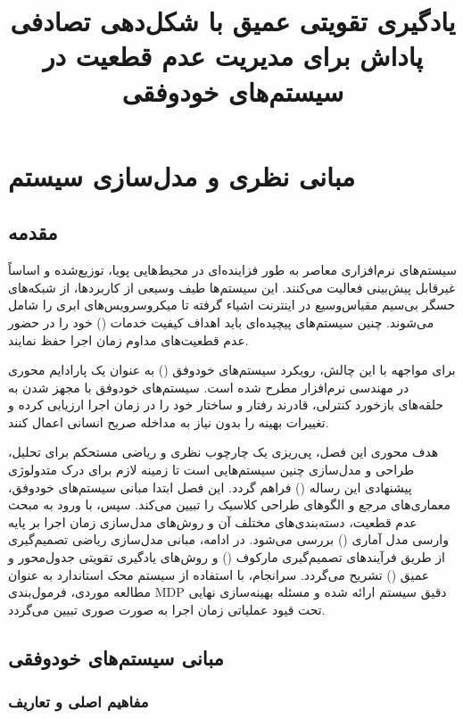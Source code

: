 \documentclass[oneside,openany,phd]{TMU-Thesis}
\title{یادگیری تقویتی عمیق با شکل‌دهی تصادفی پاداش برای مدیریت عدم قطعیت در سیستم‌های خودوفقی}
\begin{document}
\AutoPersianDigits
{}

\setcounter{chapter}{1}

\chapter{مبانی نظری و مدل‌سازی سیستم}
\label{ch:theory_and_modeling}

\section{مقدمه}

سیستم‌های نرم‌افزاری معاصر به طور فزاینده‌ای در محیط‌هایی پویا، توزیع‌شده و اساساً غیرقابل پیش‌بینی فعالیت می‌کنند. این سیستم‌ها طیف وسیعی از کاربردها، از شبکه‌های حسگر بی‌سیم مقیاس‌وسیع در اینترنت اشیاء گرفته تا میکروسرویس‌های ابری را شامل می‌شوند. چنین سیستم‌های پیچیده‌ای باید اهداف کیفیت خدمات () خود را در حضور عدم قطعیت‌های مداوم زمان اجرا حفظ نمایند.

برای مواجهه با این چالش، رویکرد سیستم‌های خودوفق () به عنوان یک پارادایم محوری در مهندسی نرم‌افزار مطرح شده است. سیستم‌های خودوفق با مجهز شدن به حلقه‌های بازخورد کنترلی، قادرند رفتار و ساختار خود را در زمان اجرا ارزیابی کرده و تغییرات بهینه را بدون نیاز به مداخله صریح انسانی اعمال کنند.

هدف محوری این فصل، پی‌ریزی یک چارچوب نظری و ریاضی مستحکم برای تحلیل، طراحی و مدل‌سازی چنین سیستم‌هایی است تا زمینه لازم برای درک متدولوژی پیشنهادی این رساله () فراهم گردد. این فصل ابتدا مبانی سیستم‌های خودوفق، معماری‌های مرجع و الگوهای طراحی کلاسیک را تبیین می‌کند. سپس، با ورود به مبحث عدم قطعیت، دسته‌بندی‌های مختلف آن و روش‌های مدل‌سازی زمان اجرا بر پایه وارسی مدل آماری () بررسی می‌شود. در ادامه، مبانی مدل‌سازی ریاضی تصمیم‌گیری از طریق فرآیندهای تصمیم‌گیری مارکوف () و روش‌های یادگیری تقویتی جدول‌محور و عمیق () تشریح می‌گردد. سرانجام، با استفاده از سیستم محک استاندارد  به عنوان مطالعه موردی، فرمول‌بندی MDP دقیق سیستم ارائه شده و مسئله بهینه‌سازی نهایی تحت قیود عملیاتی زمان اجرا به صورت صوری تبیین می‌گردد.

\section{مبانی سیستم‌های خودوفقی}

\subsection{مفاهیم اصلی و تعاریف}
\end{document}
